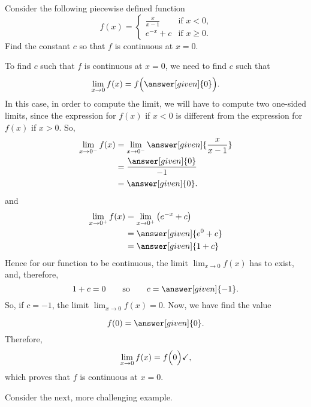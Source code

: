 \documentclass{ximera}
\begin{document}
\begin{example}
Consider the following piecewise defined function
\[
f(x) = 
\begin{cases}
  \frac{x}{x-1} &\text{if $x<0$,}\\
  e^{-x} + c &\text{if $x\ge 0$}.
\end{cases}
\]
Find the constant $c$ so that $f$ is continuous at $x=0$.
\begin{explanation}
  To find $c$ such that $f$ is continuous at $x=0$, we need to find
  $c$ such that
    \[
 \lim_{x\to 0} f(x) = f\Bigl(\answer[given]{0}\Bigr).
  \]
  In this case, in order to compute the limit, we will have to compute two one-sided limits, since the expression for  $f(x)$ if $x<0$ is  different from the expression for $f(x)$ if $x>0$.
  So,
  \begin{align*}
    \lim_{x\to 0^-} f(x) &= \lim_{x\to 0^-}\answer[given]{\frac{x}{x-1}}\\
    &= \frac{\answer[given]{0}}{-1}\\
    &=\answer[given]{0}.
  \end{align*}
and
  \begin{align*}
    \lim_{x\to 0^+} f(x) &= \lim_{x\to 0^+}\left(e^{-x}+c\right)\\
    &= \answer[given]{e^0 + c}\\
    &= \answer[given]{1+ c}
  \end{align*}
  Hence for our function to be continuous, the limit $ \lim_{x\to 0} f(x)$ has to exist, and, therefore, 
  \[
  1 + c = 0\qquad\text{so}\qquad c = \answer[given]{-1}.
  \]
  So, if $c=-1$, the limit $ \lim_{x\to 0} f(x)=0$. Now, we have find the value

\[
  f(0) = \answer[given]{0}.
  \]
  Therefore,
   \[
 \lim_{x\to 0} f(x) = f\Bigl(0\Bigr)\checkmark,
  \]
  which proves that $f$ is continuous at $x=0$.
\end{explanation}
\end{example}


Consider the next, more challenging example.
\end{document}
